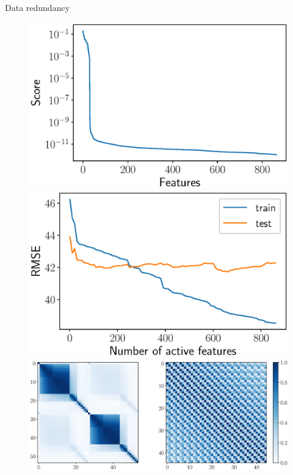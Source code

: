 \documentclass[9pt]{beamer}
\begin{document}
\begin{frame}{Data redundancy}
	\begin{figure}
		\begin{minipage}{.5\linewidth}
			\includegraphics[width=\linewidth]{figs/feature_scores_ex.eps}
		\end{minipage}%
		\begin{minipage}{.5\linewidth}
			\includegraphics[width=\linewidth]{figs/train_test_qpfs.eps}
		\end{minipage}
		\centering
		\includegraphics[width=0.9\linewidth]{figs/corr_matrix.eps}
	\end{figure}
\end{frame}
\end{document}
